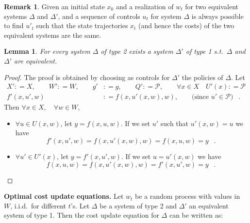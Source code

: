 \documentclass[11pt,a4paper]{article}
\DeclareMathOperator{\mf}{\enspace .}
\newcommand{\deq}{\mathrel{\mathop:}=}
\newcommand{\tone}{}
\newcommand{\ttwo}{'}
\newtheorem{lemma}{Lemma}
\theoremstyle{definition}
\newtheorem{remark}{Remark}
\theoremstyle{remark}
\begin{document}
\begin{remark}
  Given an initial state $x_0$ and a realization of $w_t$ for two equivalent
  systems $\Delta\tone$ and $\Delta\ttwo$, and a sequence of controls $u\tone_t$
  for system $\Delta\tone$ is always possible to find $u\ttwo_t$ such that the
  state trajectories $x_t$ (and hence the costs) of the two equivalent systems
  are the same.
\end{remark}
\begin{lemma}\label{belequiv}
  For every system $\Delta\tone$ of type 2 exists a system $\Delta\ttwo$ of type
  1 s.t.\ $\Delta\tone$ and $\Delta\ttwo$ are equivalent.
\end{lemma}
\begin{proof}
  The proof is obtained by choosing as controls for $\Delta\ttwo$ the policies
  of $\Delta\tone$. Let
  \begin{align}
    X'\deq X, \qquad W'\deq W, \qquad g'&\deq g, \qquad Q\ttwo\deq
    \mathcal{P}\tone, \qquad \forall x
    \in X \quad U\ttwo(x)\deq \mathcal{P}\tone \\
    f\ttwo\left(x,u\ttwo,w\right)&\deq f\tone\left(x,u'\tone(x,w),w\right),
    \qquad \text{(since $u' \in \mathcal{P}$)} \mf
  \end{align}
  Then $\forall x \in X, \quad \forall w \in W,$
  \begin{itemize}
  \item $\forall u\tone \in U\tone(x,w)$, let $y=f\tone\left(x,u\tone,w\right)$.
    If we set $u\ttwo$ such that $u\ttwo(x,w)=u\tone$ we have
    \begin{equation}
        f\ttwo\left(x,u\ttwo,w\right)=f\tone\left(x,u\ttwo(x,w),w\right)
        =f\tone\left(x,u\tone,w\right)=y \mf
    \end{equation}
  \item $\forall u\ttwo\in U\ttwo(x)$, let $y=f\ttwo\left(x,u\ttwo,w\right)$.
    If we set $u\tone=u'(x,w)$ we have
    \begin{equation}
      f\tone\left(x,u\tone,w\right) = f\tone\left(x,u\ttwo(x,w),w\right) =
      f\ttwo\left(x,u\ttwo,w\right) = y \mf
    \end{equation}
  \end{itemize}
\end{proof}
\par{\bf Optimal cost update equations.}
Let $w_t$ be a random process with values in $W$, i.i.d.\ for different $t$'s.
Let $\Delta\tone$ be a system of type 2 and $\Delta\ttwo$ an equivalent system
of type 1.  Then the cost update equation for $\Delta\tone$ can be written as:
\end{document}
